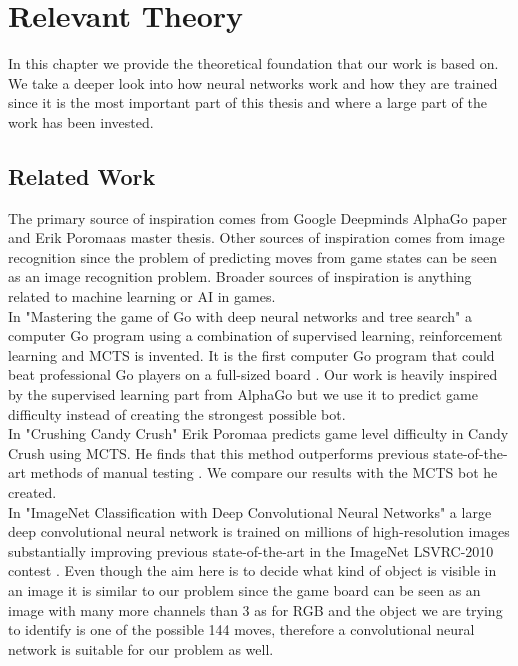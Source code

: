 \documentclass{kththesis}
\begin{document}
\chapter{Relevant Theory}
In this chapter we provide the  theoretical foundation that our work is based on. We take a deeper look into how neural networks work and how they are trained since it is the most important part of this thesis and where a large part of the work has been invested.

\section{Related Work}
The primary source of inspiration comes from  Google Deepminds AlphaGo paper and Erik Poromaas master thesis. Other sources of inspiration comes from image recognition since the problem of predicting moves from game states can be seen as an image recognition problem. Broader sources of inspiration is anything related to machine learning or AI in games.\\

In "Mastering the game of Go with deep neural networks and tree search" a computer Go program using a combination of supervised learning, reinforcement learning and MCTS is invented. It is the first computer Go program that could beat professional Go players on a full-sized board \cite{alphaGo2016}. Our work is heavily inspired by the supervised learning part from AlphaGo but we use it to predict game difficulty instead of creating the strongest possible bot. \\

In "Crushing Candy Crush" Erik Poromaa predicts game level difficulty in Candy Crush using MCTS. He finds that this method outperforms previous state-of-the-art methods of manual testing \cite{poromaa2016}. We compare our results with the MCTS bot he created. \\

In "ImageNet Classification with Deep Convolutional Neural Networks" a large deep convolutional neural network is trained on millions of high-resolution images substantially improving previous state-of-the-art in the ImageNet LSVRC-2010 contest \cite{krizhevsky2012imagenet}. Even though the aim here is to decide what kind of object is visible in an image it is similar to our problem since the game board can be seen as an image with many more channels than 3 as for RGB and the object we are trying to identify is one of the possible 144 moves, therefore a convolutional neural network is suitable for our problem as well. \\
\end{document}
